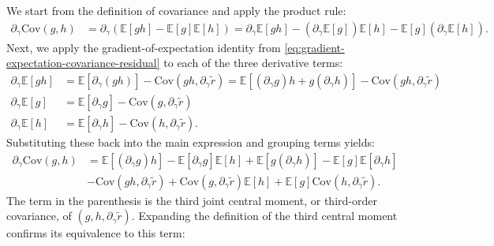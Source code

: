 \documentclass{article}
\begin{document}
We start from the definition of covariance and apply the product rule:
%
\begin{align}
  \partial_{\gamma} \mathrm{Cov}(g, h) & = \partial_{\gamma} \left( \mathbb{E}[g h] - \mathbb{E}[g]\mathbb{E}[h] \right) = \partial_{\gamma} \mathbb{E}[g h] - (\partial_{\gamma} \mathbb{E}[g]) \mathbb{E}[h] - \mathbb{E}[g] (\partial_{\gamma} \mathbb{E}[h]).
\end{align}
%
Next, we apply the gradient-of-expectation identity from \cref{eq:gradient-expectation-covariance-residual} to each of the three derivative terms:
%
\begin{align}
  \partial_{\gamma} \mathbb{E}[g h] & = \mathbb{E}[\partial_{\gamma}(g h)] - \mathrm{Cov}(g h, \partial_{\gamma} \tilde{r}) = \mathbb{E}[(\partial_{\gamma} g) h + g (\partial_{\gamma} h)] - \mathrm{Cov}(g h, \partial_{\gamma} \tilde{r}) \\
  \partial_{\gamma} \mathbb{E}[g]   & = \mathbb{E}[\partial_{\gamma} g] - \mathrm{Cov}(g, \partial_{\gamma} \tilde{r})                                                                                                                       \\
  \partial_{\gamma} \mathbb{E}[h]   & = \mathbb{E}[\partial_{\gamma} h] - \mathrm{Cov}(h, \partial_{\gamma} \tilde{r}).
\end{align}
%
Substituting these back into the main expression and grouping terms yields:
%
\begin{align}
  \partial_{\gamma} \mathrm{Cov}(g, h) & = \mathbb{E}[(\partial_{\gamma} g) h] - \mathbb{E}[\partial_{\gamma} g] \mathbb{E}[h] + \mathbb{E}[g (\partial_{\gamma} h)] - \mathbb{E}[g] \mathbb{E}[\partial_{\gamma} h]           \\
                                       & - \mathrm{Cov}(g h, \partial_{\gamma} \tilde{r}) + \mathrm{Cov}(g, \partial_{\gamma} \tilde{r}) \mathbb{E}[h] + \mathbb{E}[g] \mathrm{Cov}(h, \partial_{\gamma} \tilde{r}). \nonumber
\end{align}
%
The term in the parenthesis is the third joint central moment, or third-order covariance, of $(g, h, \partial_{\gamma} \tilde{r})$.
Expanding the definition of the third central moment confirms its equivalence to this term:
%
\end{document}
